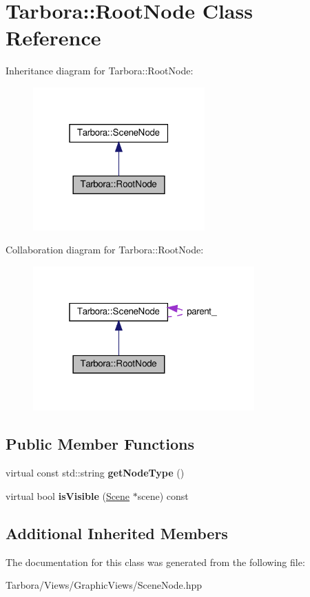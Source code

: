 \hypertarget{classTarbora_1_1RootNode}{}\section{Tarbora\+:\+:Root\+Node Class Reference}
\label{classTarbora_1_1RootNode}


Inheritance diagram for Tarbora\+:\+:Root\+Node\+:\nopagebreak
\begin{figure}[H]
\begin{center}
\leavevmode
\includegraphics[width=187pt]{classTarbora_1_1RootNode__inherit__graph}
\end{center}
\end{figure}


Collaboration diagram for Tarbora\+:\+:Root\+Node\+:\nopagebreak
\begin{figure}[H]
\begin{center}
\leavevmode
\includegraphics[width=241pt]{classTarbora_1_1RootNode__coll__graph}
\end{center}
\end{figure}
\subsection*{Public Member Functions}
\begin{DoxyCompactItemize}
\item 
\mbox{\label{classTarbora_1_1RootNode_aa95de585421b6eb9d0b7b1232856f9cf}} 
virtual const std\+::string {\bfseries get\+Node\+Type} ()
\item 
\mbox{\label{classTarbora_1_1RootNode_a77cc379a7cd2203da35004a2747d6f4d}} 
virtual bool {\bfseries is\+Visible} (\hyperlink{classTarbora_1_1Scene}{Scene} $\ast$scene) const
\end{DoxyCompactItemize}
\subsection*{Additional Inherited Members}


The documentation for this class was generated from the following file\+:\begin{DoxyCompactItemize}
\item 
Tarbora/\+Views/\+Graphic\+Views/Scene\+Node.\+hpp\end{DoxyCompactItemize}
